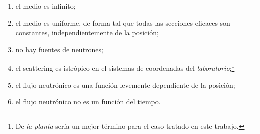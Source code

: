 \begin{enumerate}[label={(\alph*)},itemsep=-2pt,topsep=2pt]
 \item \label{it:infinito} el medio es infinito;
 \item \label{it:uniforme} el medio es uniforme, de forma tal que todas las secciones eficaces son constantes, independientemente de la posición;
 \item \label{it:sinfuentes} no hay fuentes de neutrones;
 \item \label{it:scattering} el scattering es istrópico en el sistemas de coordenadas del \emph{laboratorio};\footnote{De \emph{la planta} sería un mejor término para el caso tratado en este trabajo.}
 \item \label{it:continuo} el flujo neutrónico es una función levemente dependiente de la posición;
 \item \label{it:estacionario} el flujo neutrónico no es un función del tiempo.
\end{enumerate}


